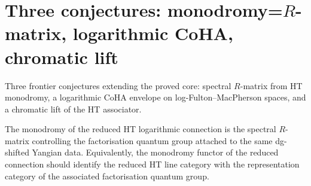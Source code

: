 \label{chap:log-ht-monodromy-frontier}

\providecommand{\A}{\mathcal A}
\providecommand{\B}{\mathcal B}
\providecommand{\C}{\mathcal C}
\providecommand{\D}{\mathcal D}
\providecommand{\E}{\mathcal E}
\providecommand{\F}{\mathcal F}
\providecommand{\FM}{\mathrm{FM}}
\providecommand{\Conf}{\mathrm{Conf}}
\providecommand{\HT}{\mathrm{HT}}
\providecommand{\MC}{\mathrm{MC}}
\providecommand{\End}{\mathrm{End}}
\providecommand{\Hom}{\mathrm{Hom}}
\providecommand{\id}{\mathrm{id}}
\providecommand{\im}{\mathrm{im}}
\providecommand{\Res}{\mathrm{Res}}
\providecommand{\Aut}{\mathrm{Aut}}
\providecommand{\PP}{\mathbb P}
\providecommand{\AA}{\mathbb A}
\providecommand{\CC}{\mathbb C}
\providecommand{\RR}{\mathbb R}
\providecommand{\ZZ}{\mathbb Z}
\providecommand{\kk}{\Bbbk}
\providecommand{\h}{\hbar}
\providecommand{\ot}{\otimes}
\providecommand{\wot}{\widehat\otimes}
\providecommand{\s}{\mathrm s}
\providecommand{\ds}{d_{\mathrm{dR}}}
\providecommand{\CYB}{\mathrm{CYB}}
\providecommand{\PT}{\mathrm{PT}}
\providecommand{\Disk}{\mathrm{Disk}}
\providecommand{\SN}{\boldsymbol{\nabla}}
\providecommand{\bboxprod}{\mathop{\boxtimes}\displaylimits}

\section{Three conjectures: monodromy=$R$-matrix, logarithmic CoHA, chromatic lift}
Three frontier conjectures extending the proved core: spectral
$R$-matrix from HT monodromy, a logarithmic CoHA envelope on
log-Fulton--MacPherson spaces, and a chromatic lift of the HT
associator.

\begin{conjecture}\label{conj:rmatrix}
The monodromy of the reduced HT logarithmic connection is the spectral $R$-matrix controlling the factorisation quantum group attached to the same dg-shifted Yangian data. Equivalently, the monodromy functor of the reduced connection should identify the reduced HT line category with the representation category of the associated factorisation quantum group.
\end{conjecture}

\providecommand{\fsl}{\mathfrak{sl}}

